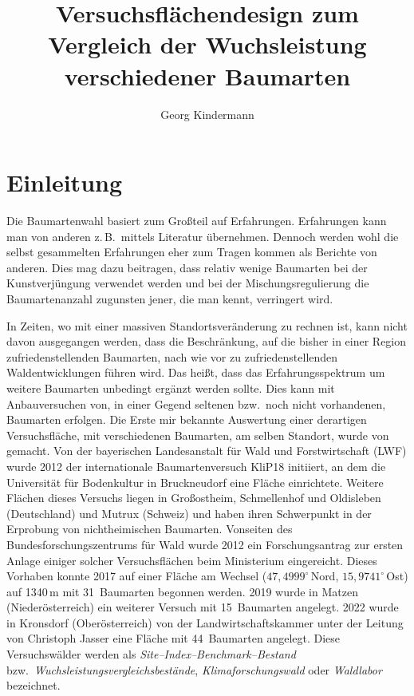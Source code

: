 \documentclass[twocolumn]{scrartcl}
\title{Versuchsflächendesign zum Vergleich der Wuchsleistung verschiedener Baumarten}
\author{Georg Kindermann}
\begin{document}
\twocolumn[
  \begin{@twocolumnfalse}
    \maketitle
  \end{@twocolumnfalse}
]

\tableofcontents

\section{Einleitung}

Die Baumartenwahl basiert zum Großteil auf Erfahrungen. Erfahrungen kann man von
anderen z.\,B.\ mittels Literatur übernehmen. Dennoch werden wohl die selbst
gesammelten Erfahrungen eher zum Tragen kommen als Berichte von anderen. Dies
mag dazu beitragen, dass relativ wenige Baumarten bei der Kunstverjüngung
verwendet werden und bei der Mischungsregulierung die Baumartenanzahl zugunsten
jener, die man kennt, verringert wird.

In Zeiten, wo mit einer massiven Standortsveränderung zu rechnen ist, kann nicht
davon ausgegangen werden, dass die Beschränkung, auf die bisher in einer Region
zufriedenstellenden Baumarten, nach wie vor zu zufriedenstellenden
Waldentwicklungen führen wird. Das heißt, dass das Erfahrungsspektrum um weitere
Baumarten unbedingt ergänzt werden sollte. Dies kann mit Anbauversuchen von, in
einer Gegend seltenen bzw.\ noch nicht vorhandenen, Baumarten erfolgen. Die
Erste mir bekannte Auswertung einer derartigen Versuchsfläche, mit verschiedenen
Baumarten, am selben Standort, wurde von \cite{mayer1970anbauversuch} gemacht.
Von der bayerischen Landesanstalt für Wald und Forstwirtschaft (LWF) wurde 2012
der internationale Baumartenversuch KliP18 initiiert, an dem die Universität für
Bodenkultur in Bruckneudorf eine Fläche einrichtete. Weitere Flächen dieses
Versuchs liegen in Großostheim, Schmellenhof und Oldisleben (Deutschland) und
Mutrux (Schweiz) und haben ihren Schwerpunkt in der Erprobung von
nichtheimischen Baumarten. Vonseiten des Bundesforschungszentrums für Wald wurde
2012 ein Forschungsantrag zur ersten Anlage einiger solcher Versuchsflächen beim
Ministerium eingereicht. Dieses Vorhaben konnte 2017 auf einer Fläche am Wechsel
($47,4999^{\circ}$\,Nord, $15,9741^{\circ}$\,Ost) auf 1340\,m mit 31~Baumarten
begonnen werden. 2019 wurde in Matzen (Niederösterreich) ein weiterer Versuch
mit 15~Baumarten angelegt. 2022 wurde in Kronsdorf (Oberösterreich) von der
Landwirtschaftskammer unter der Leitung von Christoph Jasser eine Fläche mit
44~Baumarten angelegt. Diese Versuchswälder werden als
\emph{Site--Index--Benchmark--Bestand} bzw.\
\emph{Wuchsleistungsvergleichsbestände}, \emph{Klimaforschungswald} oder
\emph{Waldlabor} bezeichnet.
\end{document}
